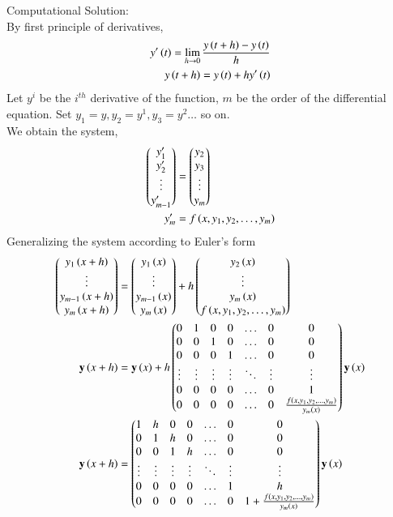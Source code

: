 \documentclass[journal]{IEEEtran}
\begin{document}
Computational Solution:\\
By first principle of derivatives,
\begin{align}
    y^{\prime}\left(t\right) = \lim_{h\to 0}\frac{y\left(t+h\right) - y\left(t\right)}{h}\\
    y\left(t+h\right) = y\left(t\right) + hy^{\prime}\left(t\right)
\end{align}
Let $y^{i}$ be the $i^{th}$ derivative of the function, $m$ be the order of the differential equation. Set $y_1=y, y_2=y^{1}, y_3=y^{2} \dots$ so on.\\
We obtain the system,
\begin{align}
    \begin{pmatrix}y_1^{\prime} \\ y_2^{\prime} \\ \vdots \\ y_{m-1}^{\prime} \end{pmatrix}&=\begin{pmatrix}y_2 \\ y_3 \\ \vdots \\ y_m\end{pmatrix}\\
y_m^{\prime}&=f\left(x, y_1, y_2, \dots, y_m\right)
\end{align}
Generalizing the system according to Euler's form\\
\begin{align}
  \begin{pmatrix}y_1\left(x+h\right) \\ \vdots \\ y_{m-1}\left(x+h\right) \\ y_m\left(x+h\right)\end{pmatrix} &=\begin{pmatrix}y_1\left(x\right) \\ \vdots \\ y_{m-1}\left(x\right) \\ y_m\left(x\right)\end{pmatrix} + h\begin{pmatrix}y_2\left(x\right) \\ \vdots \\ y_m\left(x\right) \\f\left(x, y_1, y_2, \dots, y_m\right) \end{pmatrix}\\
  \mathbf{y}\left(x+h\right) &= \mathbf{y}\left(x\right) + h\begin{pmatrix}0 & 1 & 0 & 0 & \dots & 0 & 0\\ 0 & 0 & 1 & 0 & \dots & 0 & 0\\0 & 0 & 0 & 1 & \dots & 0 & 0\\\vdots & \vdots & \vdots & \vdots& \ddots & \vdots & \vdots\\
  0 & 0 & 0 & 0 & \dots & 0 & 1\\0 & 0 & 0 & 0 & \dots & 0 &\frac{f\left(x, y_1, y_2, \dots, y_m\right)}{y_m\left(x\right)}\end{pmatrix}\mathbf{y}\left(x\right)\\
  \mathbf{y}\left(x+h\right) &= \begin{pmatrix}1 & h & 0 & 0 & \dots & 0 & 0\\ 0 & 1 & h & 0 & \dots & 0 & 0\\0 & 0 & 1 & h & \dots & 0 & 0\\\vdots & \vdots & \vdots & \vdots& \ddots & \vdots & \vdots\\
  0 & 0 & 0 & 0 & \dots & 1 & h\\0 & 0 & 0 & 0 & \dots & 0 & 1+\frac{f\left(x, y_1, y_2, \dots, y_m\right)}{y_m\left(x\right)}\end{pmatrix}\mathbf{y}\left(x\right)
\end{align}
\end{document}
